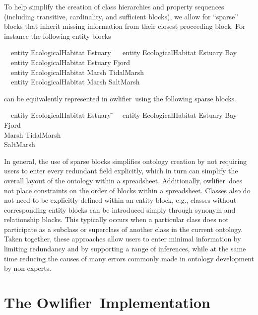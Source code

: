 \documentclass[5p,authoryear]{elsarticle}
\newcommand{\Owlifier}{\textsf{Owlifier}}
\newcommand{\owlifier}{\textsf{owlifier}}
\begin{document}
To help simplify the creation of class hierarchies and property
sequences (including transitive, cardinality, and sufficient blocks),
we allow for ``sparse'' blocks that inherit missing information from
their closest proceeding block. For instance the following entity
blocks
\begin{tabbing}
  ~~\textsf{entity} \= \textsf{EcologicalHabitat} \= \textsf{Estuary} \= \kill
  ~~\textsf{entity} \> \textsf{EcologicalHabitat} \> \textsf{Estuary} \> 
  \textsf{Bay}\\
  ~~\textsf{entity} \> \textsf{EcologicalHabitat} \> \textsf{Estuary} \>
  \textsf{Fjord} \\
  ~~\textsf{entity} \> \textsf{EcologicalHabitat} \> \textsf{Marsh} \>
  \textsf{TidalMarsh} \\ 
  ~~\textsf{entity} \> \textsf{EcologicalHabitat} \> \textsf{Marsh} \>
  \textsf{SaltMarsh}
\end{tabbing}
can be equivalently represented in \owlifier\ using the following
sparse blocks.
\begin{tabbing}
  ~~\textsf{entity} \= \textsf{EcologicalHabitat} \= \textsf{Estuary} \= \kill
  ~~\textsf{entity} \> \textsf{EcologicalHabitat} \> \textsf{Estuary} \> 
  \textsf{Bay}\\
  \> \> \> \textsf{Fjord} \\
  \> \> \textsf{Marsh} \> \textsf{TidalMarsh} \\ 
  \> \> \> \textsf{SaltMarsh}
\end{tabbing}
In general, the use of sparse blocks simplifies ontology creation by
not requiring users to enter every redundant field explicitly, which
in turn can simplify the overall layout of the ontology within a
spreadsheet.  Additionally, \owlifier\ does not place constraints on
the order of blocks within a spreadsheet. Classes also do not need to
be explicitly defined within an entity block, e.g., classes without
corresponding entity blocks can be introduced simply through synonym
and relationship blocks. This typically occurs when a particular class
does not participate as a subclass or superclass of another class in
the current ontology. Taken together, these approaches allow users to
enter minimal information by limiting redundancy and by supporting a
range of inferences, while at the same time reducing the causes of
many errors commonly made in ontology development by non-experts.



\section{The \Owlifier\ Implementation}
\label{sec:implementation}
\end{document}
